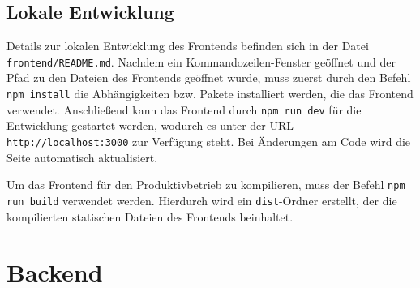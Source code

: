 %
%
\subsection{Lokale Entwicklung}

Details zur lokalen Entwicklung des Frontends befinden sich in der Datei \glqq \lstinline{frontend/README.md}\grqq{}. Nachdem ein Kommandozeilen-Fenster geöffnet und der Pfad zu den Dateien des Frontends geöffnet wurde, muss zuerst durch den Befehl \glqq \lstinline{npm install}\grqq{} die Abhängigkeiten bzw. Pakete installiert werden, die das Frontend verwendet. Anschließend kann das Frontend durch \glqq \lstinline{npm run dev}\grqq{} für die Entwicklung gestartet werden, wodurch es unter der URL \glqq \lstinline{http://localhost:3000}\grqq{} zur Verfügung steht. Bei Änderungen am Code wird die Seite automatisch aktualisiert.

Um das Frontend für den Produktivbetrieb zu kompilieren, muss der Befehl \glqq \lstinline{npm run build}\grqq{} verwendet werden. Hierdurch wird ein \glqq \lstinline{dist}\grqq{}-Ordner erstellt, der die kompilierten statischen Dateien des Frontends beinhaltet.

\section{Backend}
\label{sec:struktur-backend}
